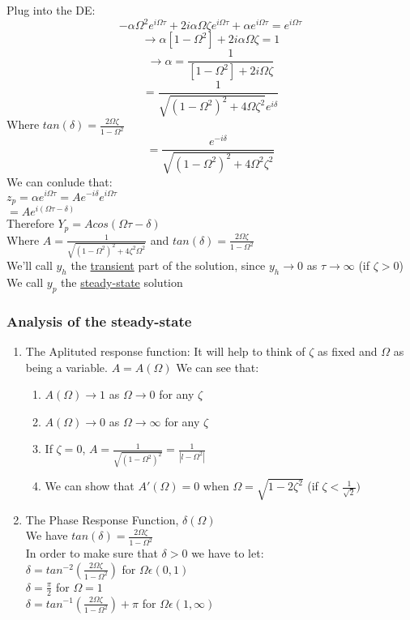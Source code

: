 \documentclass[12pt]{article}
\begin{document}
	Plug into the DE:\\
	$$-\alpha\Omega^2e^{i\Omega\tau} + 2i\alpha\Omega\zeta e^{i\Omega\tau} + \alpha e^{i\Omega\tau} = e^{i\Omega\tau}$$
	$$\rightarrow \alpha[1 - \Omega^2] + 2i \alpha \Omega \zeta = 1$$
	$$\rightarrow \alpha = \frac{1}{[1-\Omega^2] + 2i\Omega\zeta}$$
	$$ = \frac{1}{\sqrt{(1 - \Omega^2)^2 + 4\Omega\zeta^2}e^{i\delta}}$$
	Where $tan(\delta) = \frac{2\Omega\zeta}{1 - \Omega^2}$\\
	$$= \frac{e^{-i\delta}}{\sqrt{(1-\Omega^2)^2 + 4\Omega^2\zeta^2}}$$
	We can conlude that:\\
	$z_p = \alpha e^{i\Omega\tau} = Ae^{-i\delta}{e^{i\Omega\tau}}$\\
	$= Ae^{i(\Omega\tau - \delta)}$\\
	Therefore $Y_p = Acos(\Omega\tau - \delta)$\\
	Where $A = \frac{1}{\sqrt{(1-\Omega^2)^2 + 4\zeta^2\Omega^2}}$ and $tan(\delta) = \frac{2\Omega\zeta}{1-\Omega^2}$\\
	
	We'll call $y_h$ the \underline{transient} part of the solution, since $y_h \rightarrow 0$ as $\tau \rightarrow \infty$ (if $\zeta > 0$)\\
	We call $y_p$ the \underline{steady-state} solution\\
	
	\subsubsection*{Analysis of the steady-state}
	\begin{enumerate}
		\item The Aplituted response function: It will help to think of $\zeta$ as fixed and $\Omega$ as being a variable. $A = A(\Omega)$
		We can see that:
		\begin{enumerate}
			\item $A(\Omega) \rightarrow 1$ as $\Omega \rightarrow 0$ for any $\zeta$
			\item $A(\Omega) \rightarrow 0$ as $\Omega \rightarrow \infty$ for any $\zeta$
			\item If $\zeta = 0$, $A = \frac{1}{\sqrt{(1-\Omega^2)^2}} = \frac{1}{|l - \Omega^2|}$
			\item We can show that $A'(\Omega) = 0$ when $\Omega = \sqrt{1-2\zeta^2}$ (if $\zeta < \frac{1}{\sqrt{2}})$
		\end{enumerate}
		\item The Phase Response Function, $\delta(\Omega)$\\
		We have $tan(\delta) = \frac{2\Omega\zeta}{1-\Omega^2}$\\
		In order to make sure that $\delta > 0$ we have to let:\\
		$\delta = tan^{-2}(\frac{2\Omega\zeta}{1-\Omega^2})$ for $\Omega \epsilon (0,1)$\\
		$\delta = \frac{\pi}{2}$ for $\Omega = 1$\\
		$\delta = tan^{-1}(\frac{2\Omega\zeta}{1-\Omega^2}) + \pi$ for $\Omega \epsilon (1, \infty)$
	\end{enumerate}
	
	
	
	
\end{document}
